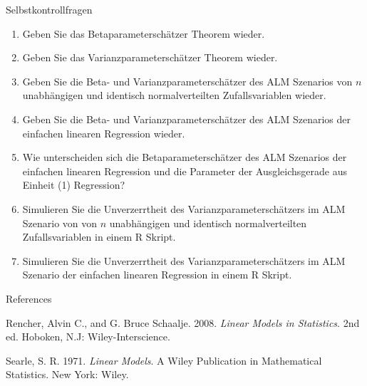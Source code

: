 \documentclass[
  8pt,
  ignorenonframetext,
]{beamer}
\providecommand{\tightlist}{%
  \setlength{\itemsep}{0pt}\setlength{\parskip}{0pt}}
\newlength{\cslhangindent}
\newlength{\cslentryspacingunit} %
\newenvironment{CSLReferences}[2] %
 {%
  \setlength{\parindent}{0pt}
  \ifodd #1
  \let\oldpar\par
  \def\par{\hangindent=\cslhangindent\oldpar}
  \fi
  \setlength{\parskip}{#2\cslentryspacingunit}
 }%
 {}
\begin{document}
\begin{frame}{Selbstkontrollfragen}
\protect\hypertarget{selbstkontrollfragen}{}
\footnotesize
{}

\begin{enumerate}
\tightlist
\item
  Geben Sie das Betaparameterschätzer Theorem wieder.
\item
  Geben Sie das Varianzparameterschätzer Theorem wieder.
\item
  Geben Sie die Beta- und Varianzparameterschätzer des ALM Szenarios von
  \(n\) unabhängigen und identisch normalverteilten Zufallsvariablen
  wieder.
\item
  Geben Sie die Beta- und Varianzparameterschätzer des ALM Szenarios der
  einfachen linearen Regression wieder.
\item
  Wie unterscheiden sich die Betaparameterschätzer des ALM Szenarios der
  einfachen linearen Regression und die Parameter der Ausgleichsgerade
  aus Einheit (1) Regression?
\item
  Simulieren Sie die Unverzerrtheit des Varianzparameterschätzers im ALM
  Szenario von von \(n\) unabhängigen und identisch normalverteilten
  Zufallsvariablen in einem R Skript.
\item
  Simulieren Sie die Unverzerrtheit des Varianzparameterschätzers im ALM
  Szenario der einfachen linearen Regression in einem R Skript.
\end{enumerate}
\end{frame}

\begin{frame}{References}
\protect\hypertarget{references}{}
\footnotesize

\hypertarget{refs}{}
\begin{CSLReferences}{1}{0}
\leavevmode{}%
Rencher, Alvin C., and G. Bruce Schaalje. 2008. \emph{Linear Models in
Statistics}. 2nd ed. {Hoboken, N.J}: {Wiley-Interscience}.

\leavevmode{}%
Searle, S. R. 1971. \emph{Linear Models}. A {Wiley} Publication in
Mathematical Statistics. {New York}: {Wiley}.

\end{CSLReferences}
\end{frame}
\end{document}
